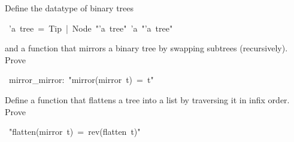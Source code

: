 \begin{isabelle}%
%
\begin{isamarkuptext}%
\noindent
Define the datatype of binary trees%
\end{isamarkuptext}%
~'a~tree~=~Tip~|~Node~{"}'a~tree{"}~'a~{"}'a~tree{"}%
\begin{isamarkuptext}%
\noindent
and a function  that mirrors a binary tree
by swapping subtrees (recursively). Prove%
\end{isamarkuptext}%
~mirror\_mirror:~{"}mirror(mirror~t)~=~t{"}%
\begin{isamarkuptext}%
\noindent
Define a function  that flattens a tree into a list
by traversing it in infix order. Prove%
\end{isamarkuptext}%
~{"}flatten(mirror~t)~=~rev(flatten~t){"}\end{isabelle}%
